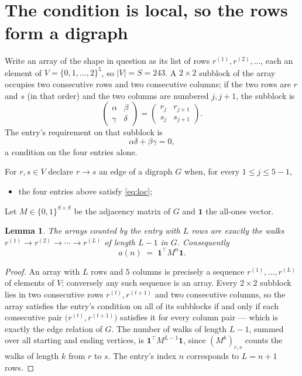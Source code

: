 \documentclass[11pt,a4paper]{article}
\theoremstyle{plain}
\newtheorem{lemma}[theorem]{Lemma}
\theoremstyle{definition}
\begin{document}
\section{The condition is local, so the rows form a digraph}

Write an array of the shape in question as its list of rows
$r^{(1)},r^{(2)},\dots$, each an element of
$V=\{0,1,\dots,2\}^{5}$, so $|V|=S=243$. A $2\times2$ subblock of the array
occupies two consecutive rows and two consecutive columns; if the two rows are $r$
and $s$ (in that order) and the two columns are numbered $j,j+1$,
the subblock is
\[
\begin{pmatrix}\alpha&\beta\\\gamma&\delta\end{pmatrix}=\begin{pmatrix}r_j&r_{j+1}\\s_j&s_{j+1}\end{pmatrix}.
\]
The entry's requirement on that subblock is
\begin{equation}\label{eq:loc}
\alpha\delta+\beta\gamma=0,
\end{equation}
a condition on the four entries alone.

For $r,s\in V$ declare $r\to s$ an edge of a digraph $G$ when, for every
$1\le j\le 5-1$,
\begin{itemize}
\item the four entries above satisfy \eqref{eq:loc};

\end{itemize}
Let $M\in\{0,1\}^{S\times S}$ be the adjacency matrix of $G$ and $\mathbf{1}$ the
all-ones vector.

\begin{lemma}\label{lem:walk}
The arrays counted by the entry with $L$ rows are exactly the walks
$r^{(1)}\to r^{(2)}\to\cdots\to r^{(L)}$ of length $L-1$ in $G$. Consequently
\[
a(n)\;=\;\mathbf{1}^{\!\top}M^{n}\mathbf{1} .
\]
\end{lemma}

\begin{proof}
An array with $L$ rows and $5$ columns is precisely a sequence
$r^{(1)},\dots,r^{(L)}$ of elements of $V$; conversely any such sequence is an array.
Every $2\times2$ subblock lies in two consecutive rows $r^{(t)},r^{(t+1)}$ and two
consecutive columns, so the array satisfies the entry's condition on all of its subblocks
if and only if each consecutive pair $\bigl(r^{(t)},r^{(t+1)}\bigr)$ satisfies it for
every column pair --- which is exactly the edge relation of $G$. The number of walks of
length $L-1$, summed over all starting and ending vertices, is
$\mathbf{1}^{\!\top}M^{L-1}\mathbf{1}$, since $(M^{k})_{r,s}$ counts the walks of
length $k$ from $r$ to $s$. The entry's index $n$ corresponds to $L=n+1$ rows.
\end{proof}
\end{document}
